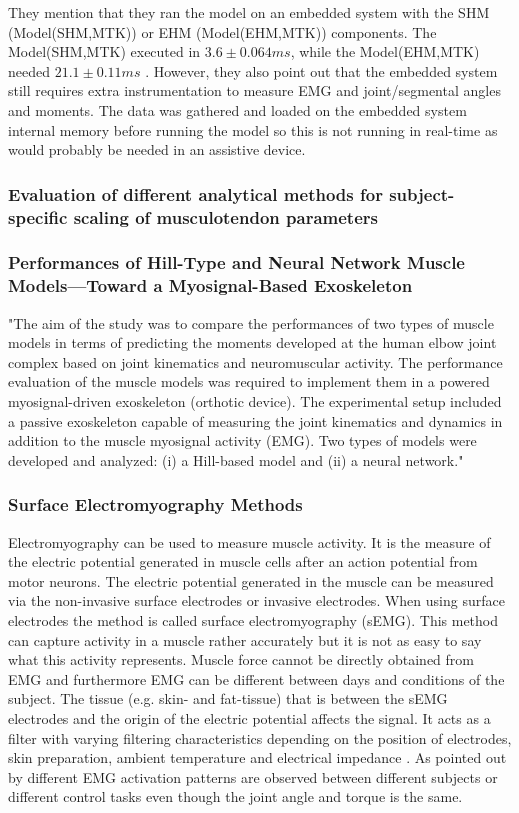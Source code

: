 They mention that they ran the model on an embedded system with the SHM (Model(SHM,MTK)) or EHM (Model(EHM,MTK)) components. 
The Model(SHM,MTK) executed in $3.6 \pm 0.064 ms$, while the Model(EHM,MTK) needed $21.1 \pm 0.11 ms$ \cite[p. 8]{Sartori2012}.
However, they also point out that the embedded system still requires extra instrumentation to measure EMG and joint/segmental angles and moments. The data was gathered and loaded on the embedded system internal memory before running the model so this is not running in real-time as would probably be needed in an assistive device.

\subsubsection{Evaluation of different analytical methods for subject-specific scaling of musculotendon parameters}

\subsubsection{Performances of Hill-Type and Neural Network Muscle
Models—Toward a Myosignal-Based Exoskeleton}

"The aim of the study was to compare the performances of two types of muscle models in terms of predicting the moments developed at the human elbow joint complex based on joint kinematics and neuromuscular activity. The performance evaluation of the muscle models was required to implement them in a powered myosignal-driven exoskeleton (orthotic device). The experimental setup included a passive exoskeleton capable of measuring the joint kinematics and dynamics in addition to the muscle myosignal activity (EMG). Two types of models were developed and analyzed: (i) a Hill-based model and (ii) a neural network." \cite[p. 1]{Rosen1999}

\subsubsection{Surface Electromyography Methods}
Electromyography can be used to measure muscle activity. 
It is the measure of the electric potential generated in muscle cells after an action potential from motor neurons. 
The electric potential generated in the muscle can be measured via the non-invasive surface electrodes or invasive electrodes. 
When using surface electrodes the method is called surface electromyography (sEMG). 
This method can capture activity in a muscle rather accurately but it is not as easy to say what this activity represents. 
Muscle force cannot be directly obtained from EMG and furthermore EMG can be different between days and conditions of the subject. 
The tissue (e.g. skin- and fat-tissue) that is between the sEMG electrodes and the origin of the electric potential affects the signal. 
It acts as a filter with varying filtering characteristics depending on the position of electrodes, skin preparation, ambient temperature and electrical impedance \cite{Lloyd2003}.  
As pointed out by  different EMG activation patterns are observed between different subjects or different control tasks even though the joint angle and torque is the same.

